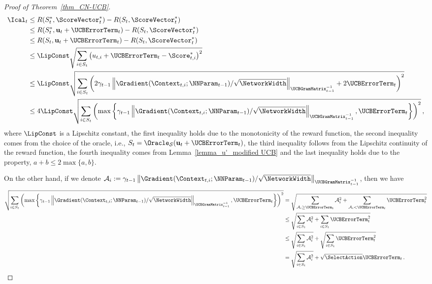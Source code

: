 \documentclass{article}
\theoremstyle{plain}
\begin{document}
\begin{proof}[Proof of Theorem~\ref{thm_CN-UCB}]
\begin{align}
        \Ical_t 
        & \le R(S_t^*, \ScoreVector_t^*) - R(S_t, \ScoreVector_t^*)
        \nonumber
        \\
        & \le R(S_t^*, \mathbf{u}_t + \mathbf{\UCBErrorTerm}_t) - R(S_t, \ScoreVector_t^*) \label{eq:instantaneous regret}
        \\
        & \le R(S_t, \mathbf{u}_t + \mathbf{\UCBErrorTerm}_t) - R(S_t, \ScoreVector_t^*) \nonumber
        \\
        & \le \LipConst \sqrt{ \sum_{i \in S_t} \left( u_{t,i} + \UCBErrorTerm_t - \Score_{t,i}^* \right)^2}
        \nonumber
        \\
        & \le \LipConst \sqrt{ \sum_{i \in S_t} \left( 2 \gamma_{t-1} \left\| \Gradient (\Context_{t,i};\NNParam_{t-1}) / \sqrt{\NetworkWidth} \right\|_{\UCBGramMatrix_{t-1}^{-1}} 
        + 2 \UCBErrorTerm_t \right)^2} \nonumber
        \\
        & \le 4 \LipConst \sqrt{ \sum_{i \in S_t} \left( \max \left\{ \gamma_{t-1} \left\| \Gradient (\Context_{t,i};\NNParam_{t-1}) / \sqrt{\NetworkWidth} \right\|_{\UCBGramMatrix_{t-1}^{-1}} 
        , \UCBErrorTerm_t  \right\} \right)^2} \, , \label{eq1_ucb thm proof}
    \end{align}
%
where $\LipConst$ is a Lipschitz constant, the first inequality holds due to the monotonicity of the reward function, the second inequality comes from the choice of the oracle, i.e., $S_t = \Oracle_{\mathcal{S}}(\mathbf{u}_t + \mathbf{\UCBErrorTerm}_t)$, the third inequality follows from the Lipschitz continuity of the reward function, the fourth inequality comes from Lemma~\ref{lemma_u'_modified UCB} and the last inequality holds due to the property, $a+b \le 2 \max \{ a, b\}$.

On the other hand, if we denote $\mathcal{A}_i := \gamma_{t-1} \left\| \Gradient (\Context_{t,i};\NNParam_{t-1}) / \sqrt{\NetworkWidth} \right\|_{\UCBGramMatrix_{t-1}^{-1}}$, then we have
%
    \begin{align}
        \sqrt{ \sum_{i \in S_t} \left( \max \left\{ \gamma_{t-1} \left\| \Gradient (\Context_{t,i};\NNParam_{t-1}) / \sqrt{\NetworkWidth} \right\|_{\UCBGramMatrix_{t-1}^{-1}} 
        , \UCBErrorTerm_t  \right\} \right)^2}
        & =\sqrt{ \sum_{\mathcal{A}_i \ge \UCBErrorTerm_t} \mathcal{A}_i^2 + \sum_{\mathcal{A}_i < \UCBErrorTerm_t} \UCBErrorTerm_t^2} \nonumber
        \\
        & \le \sqrt{ \sum_{i \in S_t} \mathcal{A}_i^2 + \sum_{i \in S_t} \UCBErrorTerm_t^2} \nonumber
        \\
        & \le \sqrt{ \sum_{i \in S_t} \mathcal{A}_i^2} + \sqrt{ \sum_{i \in S_t} \UCBErrorTerm_t^2} \nonumber
        \\
        & = \sqrt{ \sum_{i \in S_t} \mathcal{A}_i^2} + \sqrt{ \SelectAction} \UCBErrorTerm_t
        \label{eq2_ucb thm proof} \, .
    \end{align}
%


\end{proof}
\end{document}
